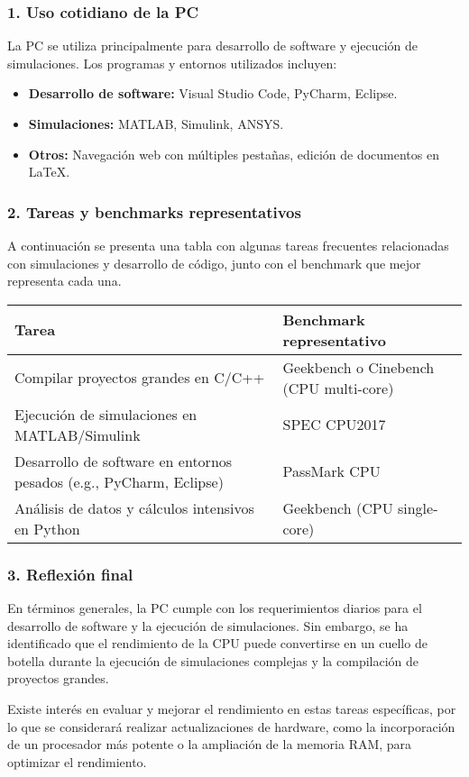 \subsubsection*{1. Uso cotidiano de la PC}
La PC se utiliza principalmente para desarrollo de software y ejecución de simulaciones. Los programas y entornos utilizados incluyen:
\begin{itemize}
    \item \textbf{Desarrollo de software:} Visual Studio Code, PyCharm, Eclipse.
    \item \textbf{Simulaciones:} MATLAB, Simulink, ANSYS.
    \item \textbf{Otros:} Navegación web con múltiples pestañas, edición de documentos en LaTeX.
\end{itemize}

\subsubsection*{2. Tareas y benchmarks representativos}

A continuación se presenta una tabla con algunas tareas frecuentes relacionadas con simulaciones y desarrollo de código, junto con el benchmark que mejor representa cada una.

\begin{center}
\begin{tabular}{|p{7cm}|p{7cm}|}
\hline
\textbf{Tarea} & \textbf{Benchmark representativo} \\
\hline
Compilar proyectos grandes en C/C++ & Geekbench o Cinebench (CPU multi-core) \\
\hline
Ejecución de simulaciones en MATLAB/Simulink & SPEC CPU2017 \\
\hline
Desarrollo de software en entornos pesados (e.g., PyCharm, Eclipse) & PassMark CPU \\
\hline
Análisis de datos y cálculos intensivos en Python & Geekbench (CPU single-core) \\
\hline
\end{tabular}
\end{center}

\subsubsection*{3. Reflexión final}
En términos generales, la PC cumple con los requerimientos diarios para el desarrollo de software y la ejecución de simulaciones. Sin embargo, se ha identificado que el rendimiento de la CPU puede convertirse en un cuello de botella durante la ejecución de simulaciones complejas y la compilación de proyectos grandes. 

Existe interés en evaluar y mejorar el rendimiento en estas tareas específicas, por lo que se considerará realizar actualizaciones de hardware, como la incorporación de un procesador más potente o la ampliación de la memoria RAM, para optimizar el rendimiento.
